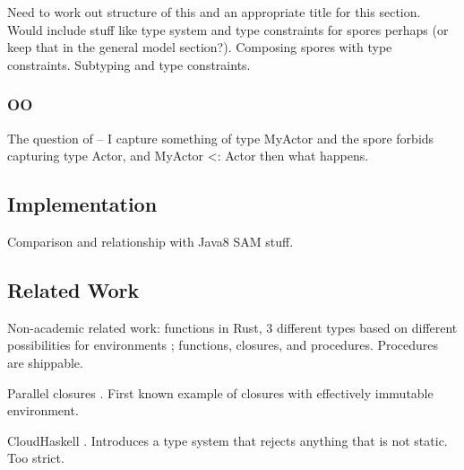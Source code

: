 \documentclass{llncs}
\begin{document}
Need to work out structure of this and an appropriate title for this section. Would include stuff like type system and type constraints for spores perhaps (or keep that in the general model section?). Composing spores with type constraints. Subtyping and type constraints.

\subsubsection{OO}

The question of -- I capture something of type MyActor
and the spore forbids capturing type Actor, and MyActor <: Actor
then what happens.

\subsection{Implementation}

Comparison and relationship with Java8 SAM stuff.

\subsection{Related Work}

Non-academic related work: functions in Rust, 3 different types based on
different possibilities for environments \cite{RustFunctions}; functions,
closures, and procedures. Procedures are shippable.

Parallel closures \cite{ParallelClosures}. First known example of closures
with effectively immutable environment.

CloudHaskell \cite{CloudHaskell}. Introduces a type system that rejects anything
that is not static. Too strict.




\end{document}
